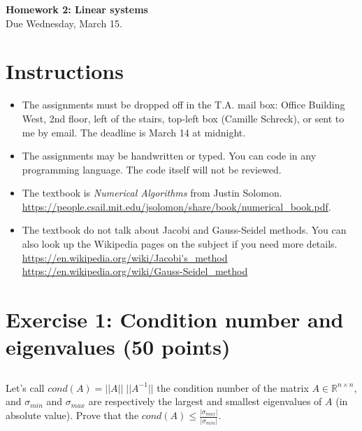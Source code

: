 


\begin{center}
{\large\textbf{Homework 2: Linear systems}}\\
Due Wednesday, March 15.
\end{center}

\noindent\makebox[\linewidth]{\rule{\linewidth}{0.6pt}}
 
\section*{Instructions}

\begin{itemize}
\item The assignments must be dropped off in the T.A. mail box: Office Building West, 2nd floor, left of the stairs, top-left box (Camille Schreck), or sent to me by email. The deadline is March 14  at midnight.
\item The assignments may be handwritten or typed. You can code in any programming language. The code itself will not be reviewed. 
\item The textbook is \emph{Numerical Algorithms} from Justin Solomon.\\ \url{https://people.csail.mit.edu/jsolomon/share/book/numerical_book.pdf}.
\item The textbook do not talk about Jacobi and Gauss-Seidel methods. You can also look up the Wikipedia pages on the subject if you need more details.\\
  \url{https://en.wikipedia.org/wiki/Jacobi's_method}\\
  \url{https://en.wikipedia.org/wiki/Gauss-Seidel_method}
  
\end{itemize}



\noindent\makebox[\linewidth]{\rule{\linewidth}{0.6pt}}

\section*{Exercise 1: Condition number and eigenvalues \normalsize \textnormal(50 points)}

\subsection{} Let's call $cond(A) = ||A||\;||A^{-1}||$ the condition number of the matrix $A \in \mathds{R}^{n\times n}$, and $\sigma_{min}$  and $\sigma_{max}$ are respectively the largest and smallest eigenvalues of $A$ (in absolute value). 
Prove that the $cond(A) \leq \frac{|\sigma_{max}|}{|\sigma_{min}|}$.


